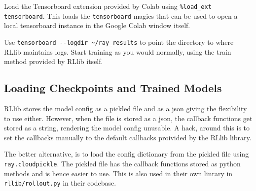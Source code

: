 \documentclass{article}
\begin{document}
Load the Tensorboard extension provided by Colab using \lstinline{%load_ext tensorboard}. This loads the \lstinline{tensorboard} magics that can be used to open a local tensorboard instance in the Google Colab window itself.

Use \lstinline{tensorboard --logdir ~/ray_results} to point the directory to where RLlib maintains logs. Start training as you would normally, using the train method provided by RLlib itself.

\subsection{Loading Checkpoints and Trained Models}
RLlib stores the model config as a pickled file and as a json giving the flexibility to use either. However, when the file is stored as a json, the callback functions get stored as a string, rendering the model config unusable. A hack, around this is to set the callbacks manually to the default callbacks proivided by the RLlib library.

The better alternative, is to load the config dictionary from the pickled file using \lstinline{ray.cloudpickle}. The pickled file has the callback functions stored as python methods and is hence easier to use. This is also used in their own linrary in \lstinline{rllib/rollout.py} in their codebase.



\end{document}
